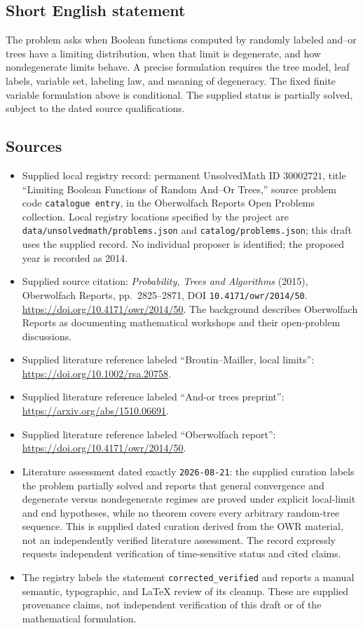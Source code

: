 \documentclass[11pt]{article}
\begin{document}
\subsection{Short English statement}
The problem asks when Boolean functions computed by randomly labeled and--or trees have a limiting distribution, when that limit is degenerate, and how nondegenerate limits behave. A precise formulation requires the tree model, leaf labels, variable set, labeling law, and meaning of degeneracy. The fixed finite variable formulation above is conditional. The supplied status is partially solved, subject to the dated source qualifications.
\subsection{Sources}
\begin{itemize}
\item Supplied local registry record: permanent UnsolvedMath ID \(30002721\), title ``Limiting Boolean Functions of Random And--Or Trees,'' source problem code \texttt{catalogue entry}, in the Oberwolfach Reports Open Problems collection. Local registry locations specified by the project are \texttt{data/unsolvedmath/problems.json} and \texttt{catalog/problems.json}; this draft uses the supplied record. No individual proposer is identified; the proposed year is recorded as 2014.
\item Supplied source citation: \emph{Probability, Trees and Algorithms} (2015), Oberwolfach Reports, pp.\ 2825--2871, DOI \texttt{10.4171/owr/2014/50}. \url{https://doi.org/10.4171/owr/2014/50}. The background describes Oberwolfach Reports as documenting mathematical workshops and their open-problem discussions.
\item Supplied literature reference labeled ``Broutin--Mailler, local limits'': \url{https://doi.org/10.1002/rsa.20758}.
\item Supplied literature reference labeled ``And-or trees preprint'': \url{https://arxiv.org/abs/1510.06691}.
\item Supplied literature reference labeled ``Oberwolfach report'': \url{https://doi.org/10.4171/owr/2014/50}.
\item Literature assessment dated exactly \texttt{2026-08-21}: the supplied curation labels the problem partially solved and reports that general convergence and degenerate versus nondegenerate regimes are proved under explicit local-limit and end hypotheses, while no theorem covers every arbitrary random-tree sequence. This is supplied dated curation derived from the OWR material, not an independently verified literature assessment. The record expressly requests independent verification of time-sensitive status and cited claims.
\item The registry labels the statement \texttt{corrected\_verified} and reports a manual semantic, typographic, and LaTeX review of its cleanup. These are supplied provenance claims, not independent verification of this draft or of the mathematical formulation.
\end{itemize}
\end{document}
